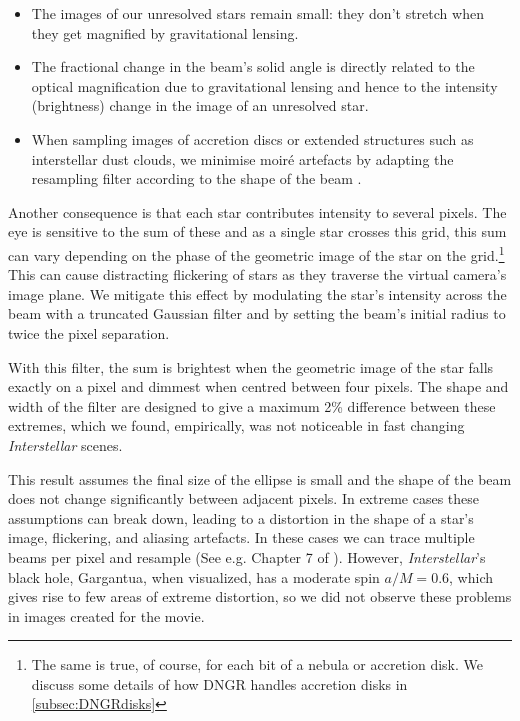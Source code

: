 \documentclass[12pt]{iopart}
\begin{document}
\begin{itemize}
\item The images of our unresolved stars remain small: they don't stretch when they get magnified by
gravitational lensing.

\item The fractional change in the beam's solid angle is directly related to the optical magnification
due to gravitational lensing and hence to the intensity (brightness) change in the image of an unresolved star.

\item When sampling images of accretion discs or extended structures such as interstellar dust clouds,
we minimise moir\'e artefacts by adapting the resampling filter according to the shape of the beam
\cite{GRE86}.
\end{itemize}


Another consequence is that
each star contributes intensity to several pixels. The eye is sensitive to the sum of these  and as a single star crosses this grid, this sum can vary depending on the phase of the geometric image of the star on the grid.\footnote{The same is true, of course, for each bit of a nebula or accretion disk.  We  discuss some details of how DNGR handles accretion disks in \ref{subsec:DNGRdisks}}
This can cause distracting flickering of stars as they traverse the virtual camera's image plane. We mitigate this effect by modulating the star's intensity across the beam with a truncated Gaussian filter and by setting the beam's initial radius to twice the pixel separation.

With this filter, the sum is brightest when the geometric image of the star falls exactly on a pixel and dimmest when centred between four pixels. The shape and width of the filter are designed to give a maximum 2\% difference between these extremes, which we  found, empirically, was not noticeable in fast changing \emph{Interstellar} scenes.

This result assumes the final size of the ellipse is small and the shape of the beam does not change significantly between adjacent pixels. In extreme cases these assumptions can break
down, leading to a distortion in the shape of a star's image, flickering, and aliasing artefacts. 
In these cases we can trace multiple beams per pixel and resample (See e.g. Chapter 7 of \cite{PBRT}).
However, \emph{Interstellar}'s black hole, Gargantua, when visualized,
has a moderate
spin $a/M=0.6$, which gives rise to few areas of extreme distortion, so we did not observe these problems in images created for the movie.
\end{document}
